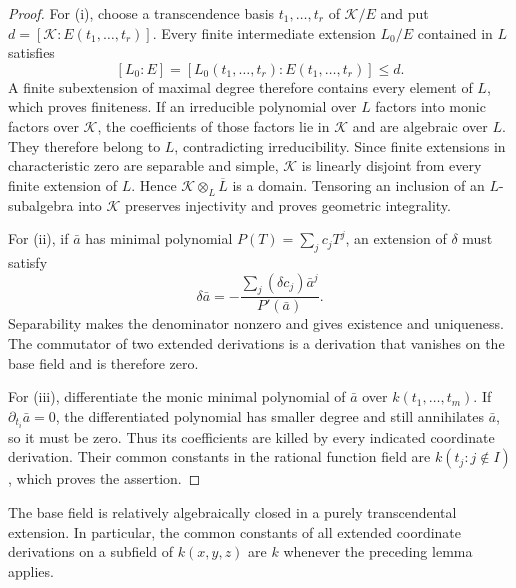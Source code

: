 \begin{proof}
For (i), choose a transcendence basis $t_1,\ldots,t_r$ of $\mathcal K/E$ and put $d=[\mathcal K:E(t_1,\ldots,t_r)]$. Every finite intermediate extension $L_0/E$ contained in $L$ satisfies
\[
 [L_0:E]=[L_0(t_1,\ldots,t_r):E(t_1,\ldots,t_r)]\leq d.
\]
A finite subextension of maximal degree therefore contains every element of $L$, which proves finiteness. If an irreducible polynomial over $L$ factors into monic factors over $\mathcal K$, the coefficients of those factors lie in $\mathcal K$ and are algebraic over $L$. They therefore belong to $L$, contradicting irreducibility. Since finite extensions in characteristic zero are separable and simple, $\mathcal K$ is linearly disjoint from every finite extension of $L$. Hence $\mathcal K\otimes_L\overline L$ is a domain. Tensoring an inclusion of an $L$-subalgebra into $\mathcal K$ preserves injectivity and proves geometric integrality.

For (ii), if $\bar{a}$ has minimal polynomial $P(T)=\sum_j c_jT^j$, an extension of $\delta$ must satisfy
\[
 \delta \bar{a}=-\frac{\sum_j(\delta c_j)\bar{a}^j}{P'(\bar{a})}.
\]
Separability makes the denominator nonzero and gives existence and uniqueness. The commutator of two extended derivations is a derivation that vanishes on the base field and is therefore zero.

For (iii), differentiate the monic minimal polynomial of $\bar{a}$ over $k(t_1,\ldots,t_m)$. If $\partial_{t_i}\bar{a}=0$, the differentiated polynomial has smaller degree and still annihilates $\bar{a}$, so it must be zero. Thus its coefficients are killed by every indicated coordinate derivation. Their common constants in the rational function field are $k(t_j:j\notin I)$, which proves the assertion.
\end{proof}

The base field is relatively algebraically closed in a purely transcendental extension. In particular, the common constants of all extended coordinate derivations on a subfield of $k(x,y,z)$ are $k$ whenever the preceding lemma applies.
